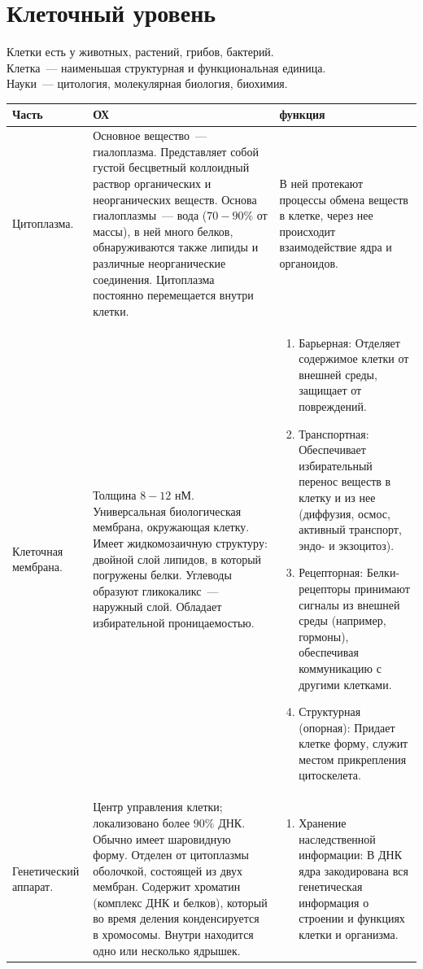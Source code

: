 \documentclass[12pt]{article}
\begin{document}
	\section{Клеточный уровень}
	Клетки есть у животных, растений, грибов, бактерий.\\
	Клетка~--- наименьшая структурная и функциональная единица.\\
	Науки~--- цитология, молекулярная биология, биохимия.\\
	\begin{xltabular}{\textwidth}{|X|X|X|}
		\hline
		Часть & ОХ & функция\\
		\hline
		Цитоплазма. & Основное вещество~--- гиалоплазма. Представляет собой густой бесцветный коллоидный раствор органических и неорганических веществ. Основа гиалоплазмы~--- вода ($70-90\%$ от массы), в ней много белков, обнаруживаются также липиды и различные неорганические соединения. Цитоплазма постоянно перемещается внутри клетки. & В ней протекают процессы обмена веществ в клетке, через нее происходит взаимодействие ядра и органоидов.\\
		\hline 
		Клеточная мембрана. & Толщина $8-12$ нМ. Универсальная биологическая мембрана, окружающая клетку. Имеет жидкомозаичную структуру: двойной слой липидов, в который погружены белки. Углеводы образуют гликокаликс~--- наружный слой. Обладает избирательной проницаемостью. & \begin{enumerate}
			\item Барьерная: Отделяет содержимое клетки от внешней среды, защищает от повреждений.
			\item Транспортная: Обеспечивает избирательный перенос веществ в клетку и из нее (диффузия, осмос, активный транспорт, эндо- и экзоцитоз).
			\item Рецепторная: Белки-рецепторы принимают сигналы из внешней среды (например, гормоны), обеспечивая коммуникацию с другими клетками.
			\item Структурная (опорная): Придает клетке форму, служит местом прикрепления цитоскелета.
		\end{enumerate}\\
		\hline
		Генетический аппарат. & Центр управления клетки; локализовано более $90\%$ ДНК. Обычно имеет шаровидную форму. Отделен от цитоплазмы оболочкой, состоящей из двух мембран. Содержит хроматин (комплекс ДНК и белков), который во время деления конденсируется в хромосомы. Внутри находится одно или несколько ядрышек. & \begin{enumerate}
			\item Хранение наследственной информации: В ДНК ядра закодирована вся генетическая информация о строении и функциях клетки и организма.

\end{enumerate}
\end{xltabular}
\end{document}
